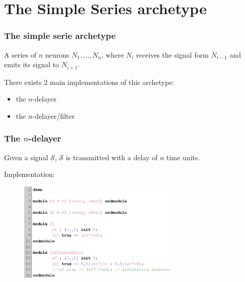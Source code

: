 \section{The Simple Series archetype}
\begin{frame}
  \frametitle{The simple serie archetype}

  \begin{definition}
    A series of $n$ neurons $N_1, ..., N_n$, where $N_i$ receives the signal form $N_{i-1}$ and emits its signal to $N_{i+1}$.
  \end{definition}

  \mysep{}

  There exists $2$ main implementations of this archetype:
  \begin{itemize}
    \item the $n$-delayer
    \item the $n$-delayer/filter
  \end{itemize}

\end{frame}

\begin{frame}[fragile]
  \frametitle{The $n$-delayer}

  Given a signal $\mathcal{S}$, $\mathcal{S}$ is transmitted with a delay of $n$ time units.

  \mysep{}

  Implementation:

  \begin{figure}
    \includegraphics[width=0.7\textwidth]{pic/simple_serie1_code.png}
  \end{figure}

\end{frame}

